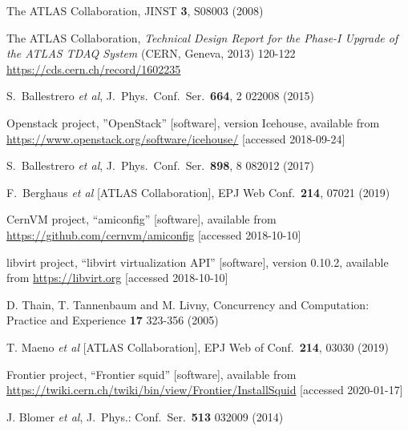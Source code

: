\documentclass{webofc}
\begin{document}
\begin{thebibliography}{}
   The ATLAS Collaboration,
   JINST \textbf{3}, S08003 (2008)

    The ATLAS Collaboration, \textit{Technical Design Report for the Phase-I
    Upgrade of the ATLAS TDAQ System} (CERN, Geneva, 2013) 120-122
    \url{https://cds.cern.ch/record/1602235}

    S.~Ballestrero \textit{et al},
    J.\ Phys.\ Conf.\ Ser.\  \textbf{664}, 2 022008 (2015)

    Openstack project, ”OpenStack” [software], version Icehouse, available from
    \url{https://www.openstack.org/software/icehouse/} [accessed 2018-09-24]

    S.~Ballestrero \textit{et al},
    J.\ Phys.\ Conf.\ Ser.\  \textbf{898},  8 082012 (2017)

    F.~Berghaus \textit{et al} [ATLAS Collaboration],
    EPJ Web Conf.\ \textbf{214}, 07021 (2019)

    CernVM project, ``amiconfig'' [software], available from
    \url{https://github.com/cernvm/amiconfig} [accessed 2018-10-10]

    libvirt project, ``libvirt virtualization API'' [software], version 0.10.2,
    available from \url{https://libvirt.org} [accessed 2018-10-10]

    D. Thain, T. Tannenbaum and M. Livny,
    Concurrency and Computation: Practice and Experience \textbf{17} 323-356 (2005)

    T. Maeno \textit{et al} [ATLAS Collaboration],
    EPJ Web of Conf.\ \textbf{214}, 03030 (2019)

    Frontier project, ``Frontier squid'' [software], available from
    \url{https://twiki.cern.ch/twiki/bin/view/Frontier/InstallSquid}
    [accessed 2020-01-17]

    J. Blomer \textit{et al},
    J.\ Phys.: Conf.\ Ser.\ \textbf{513} 032009 (2014)

\end{thebibliography}
\end{document}
